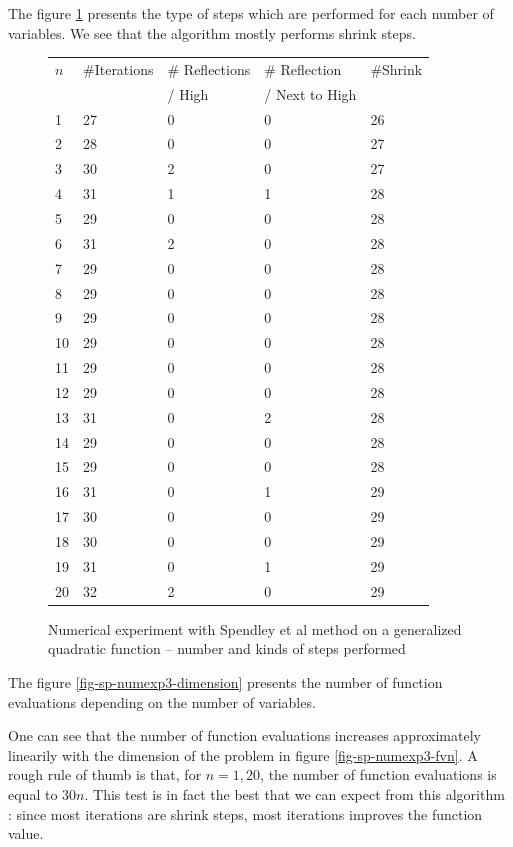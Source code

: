 The figure \ref{fig-sp-numexp3-nbsteps} presents the type of 
steps which are performed for each number of variables.
We see that the algorithm mostly performs shrink steps.

\begin{figure}[htbp]
\begin{center}
\begin{tiny}
\begin{tabular}{|l|l|l|l|l|}
\hline
$n$ & \#Iterations & \# Reflections & \# Reflection & \#Shrink\\
 & & / High & / Next to High & \\
\hline
1 & 27 & 0 & 0 & 26\\
2 & 28 & 0 & 0 & 27\\
3 & 30 & 2 & 0 & 27\\
4 & 31 & 1 & 1 & 28\\
5 & 29 & 0 & 0 & 28\\
6 & 31 & 2 & 0 & 28\\
7 & 29 & 0 & 0 & 28\\
8 & 29 & 0 & 0 & 28\\
9 & 29 & 0 & 0 & 28\\
10 & 29 & 0 & 0 & 28\\
11 & 29 & 0 & 0 & 28\\
12 & 29 & 0 & 0 & 28\\
13 & 31 & 0 & 2 & 28\\
14 & 29 & 0 & 0 & 28\\
15 & 29 & 0 & 0 & 28\\
16 & 31 & 0 & 1 & 29\\
17 & 30 & 0 & 0 & 29\\
18 & 30 & 0 & 0 & 29\\
19 & 31 & 0 & 1 & 29\\
20 & 32 & 2 & 0 & 29\\
\hline
\end{tabular}
\end{tiny}
\end{center}
\caption{Numerical experiment with Spendley et al method on a generalized quadratic function -- number 
and kinds of steps performed}
\label{fig-sp-numexp3-nbsteps}
\end{figure}

The figure \ref{fig-sp-numexp3-dimension} presents the number of function 
evaluations depending on the number of variables.

One can see that the number of function evaluations 
increases approximately linearily with the dimension of the problem in
figure \ref{fig-sp-numexp3-fvn}. A rough rule of thumb is that, for $n=1,20$, 
the number of function evaluations is equal to $30n$.
This test is in fact the best that we can expect from this algorithm : since 
most iterations are shrink steps, most iterations improves the function value.

